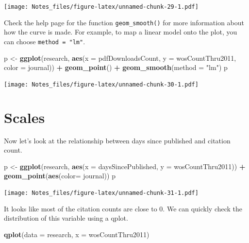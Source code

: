 \documentclass[
]{book}
\newenvironment{Shaded}{\begin{snugshade}}{\end{snugshade}}
\newcommand{\DataTypeTok}[1]{\textcolor[rgb]{0.13,0.29,0.53}{#1}}
\newcommand{\KeywordTok}[1]{\textcolor[rgb]{0.13,0.29,0.53}{\textbf{#1}}}
\newcommand{\NormalTok}[1]{#1}
\newcommand{\OperatorTok}[1]{\textcolor[rgb]{0.81,0.36,0.00}{\textbf{#1}}}
\newcommand{\StringTok}[1]{\textcolor[rgb]{0.31,0.60,0.02}{#1}}
\begin{document}
\texttt{[image: Notes\_files/figure-latex/unnamed-chunk-29-1.pdf]}

Check the help page for the function \texttt{geom\_smooth()} for more information about how the curve is made. For example, to map a linear model onto the plot, you can choose \texttt{method\ =\ "lm"}.

\begin{Shaded}
\begin{Highlighting}[]
\NormalTok{p <-}\StringTok{ }\KeywordTok{ggplot}\NormalTok{(research, }\KeywordTok{aes}\NormalTok{(}\DataTypeTok{x =}\NormalTok{ pdfDownloadsCount, }
                          \DataTypeTok{y =}\NormalTok{ wosCountThru2011, }
                          \DataTypeTok{color =}\NormalTok{ journal)) }\OperatorTok{+}\StringTok{ }
\StringTok{  }\KeywordTok{geom_point}\NormalTok{() }\OperatorTok{+}\StringTok{ }
\StringTok{  }\KeywordTok{geom_smooth}\NormalTok{(}\DataTypeTok{method =} \StringTok{"lm"}\NormalTok{)}
\NormalTok{p}
\end{Highlighting}
\end{Shaded}

\texttt{[image: Notes\_files/figure-latex/unnamed-chunk-30-1.pdf]}

\hypertarget{scales}{%
\section{Scales}\label{scales}}

Now let's look at the relationship between days since published and citation count.

\begin{Shaded}
\begin{Highlighting}[]
\NormalTok{p <-}\StringTok{ }\KeywordTok{ggplot}\NormalTok{(research, }\KeywordTok{aes}\NormalTok{(}\DataTypeTok{x =}\NormalTok{ daysSincePublished, }
                          \DataTypeTok{y =}\NormalTok{ wosCountThru2011)) }\OperatorTok{+}\StringTok{ }
\StringTok{  }\KeywordTok{geom_point}\NormalTok{(}\KeywordTok{aes}\NormalTok{(}\DataTypeTok{color=}\NormalTok{ journal))}
\NormalTok{p}
\end{Highlighting}
\end{Shaded}

\texttt{[image: Notes\_files/figure-latex/unnamed-chunk-31-1.pdf]}

It looks like most of the citation counts are close to 0. We can quickly check the distribution of this variable using a qplot.

\begin{Shaded}
\begin{Highlighting}[]
\KeywordTok{qplot}\NormalTok{(}\DataTypeTok{data =}\NormalTok{ research, }\DataTypeTok{x =}\NormalTok{ wosCountThru2011)}
\end{Highlighting}
\end{Shaded}
\end{document}
